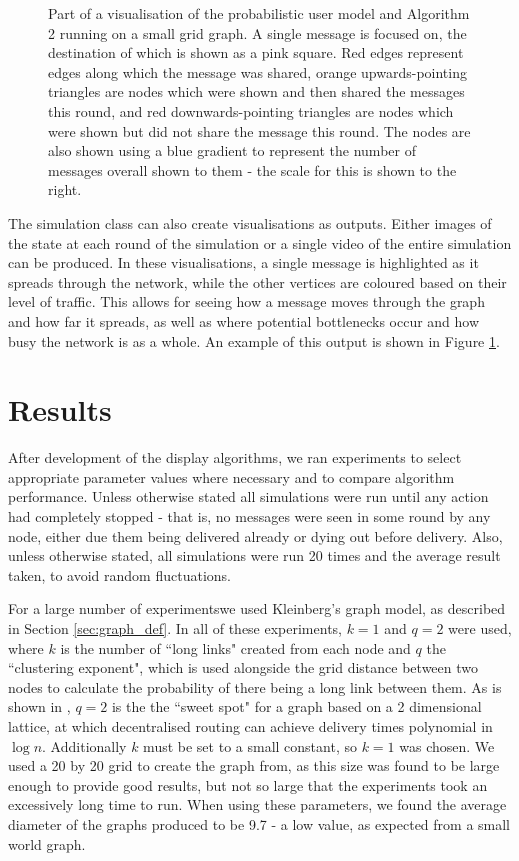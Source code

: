 \documentclass[bsc,frontabs,twoside,singlespacing,parskip,deptreport]{infthesis}     %
\begin{document}
\begin{figure}
\begin{subfigure}[]{0.47\textwidth}
\end{subfigure}
\caption{Part of a visualisation of the probabilistic user model and Algorithm 2 running on a small grid graph. A single message is focused on, the destination of which is shown as a pink square. Red edges represent edges along which the message was shared, orange upwards-pointing triangles are nodes which were shown and then shared the messages this round, and red downwards-pointing triangles are nodes which were shown but did not share the message this round. The nodes are also shown using a blue gradient to represent the number of messages overall shown to them - the scale for this is shown to the right.}
\label{fig:visualisation}
\end{figure}

The simulation class can also create visualisations as outputs. Either images of the state at each round of the simulation or a single video of the entire simulation can be produced. In these visualisations, a single message is highlighted as it spreads through the network, while the other vertices are coloured based on their level of traffic. This allows for seeing how a message moves through the graph and how far it spreads, as well as where potential bottlenecks occur and how busy the network is as a whole. An example of this output is shown in Figure \ref{fig:visualisation}.


\chapter{Results} \label{chapter4}
After development of the display algorithms, we ran experiments to select appropriate parameter values where necessary and to compare algorithm performance. Unless otherwise stated all simulations were run until any action had completely stopped - that is, no messages were seen in some round by any node, either due them being delivered already or dying out before delivery. Also, unless otherwise stated, all simulations were run 20 times and the average result taken, to avoid random fluctuations.

For a large number of experimentswe used Kleinberg's graph model, as described in Section \ref{sec:graph_def}. In all of these experiments, $k=1$ and $q=2$ were used, where $k$ is the number of ``long links" created from each node and $q$ the ``clustering exponent", which is used alongside the grid distance between two nodes to calculate the probability of there being a long link between them. As is shown in \cite{Kleinberg00},  $q=2$ is the the ``sweet spot" for a graph based on a 2 dimensional lattice, at which decentralised routing can achieve delivery times polynomial in $\log n$. Additionally $k$ must be set to a small constant, so $k=1$ was chosen. We used a 20 by 20 grid to create the graph from, as this size was found to be large enough to provide good results, but not so large that the experiments took an excessively long time to run. When using these parameters, we found the average diameter of the graphs produced to be 9.7 - a low value, as expected from a small world graph.
\end{document}
